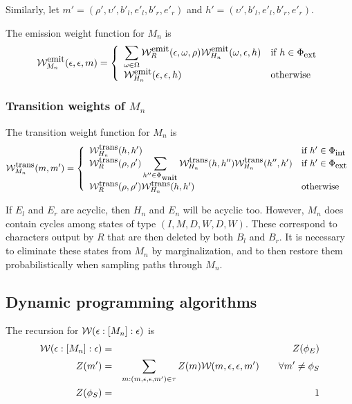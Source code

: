 \documentclass{article}
\newcommand{\seclabel}[1]{\label{sec.#1}}
\newcommand\wtrans[4]{#1(#2 : [#3] : #4)}
\newcommand\States{\Phi}
\newcommand\statesof[1]{\States_{#1}}
\newcommand\Transitions{\tau}
\newcommand\startstate{\phi_S}
\newcommand\laststate{\phi_E}
\newcommand\weight{{\cal W}}
\newcommand\weightfunof[1]{\weight_{#1}}
\newcommand\transweightfun[1]{\weightfunof{#1}^{\mbox{\small trans}}}
\newcommand\emitweightfun[1]{\weightfunof{#1}^{\mbox{\small emit}}}
\newcommand\stateset[1]{\statesof{\mbox{\small #1}}}
\newcommand\hstatedest{(\upsilon',b'_l,e'_l,b'_r,e'_r)}
\newcommand\externalsuffix{ext}
\newcommand\internalsuffix{int}
\newcommand\waitsuffix{wait}
\newcommand\externalcascades{\stateset{\externalsuffix}}
\newcommand\internalcascades{\stateset{\internalsuffix}}
\newcommand\waitstates{\stateset{\waitsuffix}}
\newcommand\mstatedest{(\rho',\upsilon',b'_l,e'_l,b'_r,e'_r)}
\begin{document}
Similarly, let $m' = \mstatedest$ and $h' = \hstatedest$.

The emission weight function for $M_n$ is
\[
\emitweightfun{M_n}(\epsilon,\epsilon,m) = \left\{
\begin{array}{ll}
\displaystyle
\sum_{\omega \in \Omega} \emitweightfun{R}(\epsilon,\omega,\rho) \emitweightfun{H_n}(\omega,\epsilon,h)
 & \mbox{if $h \in \externalcascades$} \\
\emitweightfun{H_n}(\epsilon,\epsilon,h)
 & \mbox{otherwise}
\end{array}
\right.
\]

\subsubsection{Transition weights of $M_n$}
The transition weight function for $M_n$ is
\[
\transweightfun{M_n}(m,m') = \left\{
\begin{array}{ll}
\displaystyle
\transweightfun{H_n}(h,h')
 & \mbox{if $h' \in \internalcascades$} \\
\displaystyle
\transweightfun{R}(\rho,\rho') \sum_{h'' \in \waitstates} \transweightfun{H_n}(h,h'') \transweightfun{H_n}(h'',h')
 & \mbox{if $h' \in \externalcascades$} \\
\transweightfun{R}(\rho,\rho') \transweightfun{H_n}(h,h')
 & \mbox{otherwise}
\end{array}
\right.
\]

If $E_l$ and $E_r$ are acyclic, then $H_n$ and $E_n$ will be acyclic too.
However, $M_n$ does contain cycles among states of type $(I,M,D,W,D,W)$.
These correspond to characters output by $R$ that are then deleted by both $B_l$ and $B_r$.
It is necessary to eliminate these states from $M_n$ by marginalization, and to then restore them probabilistically when sampling paths through $M_n$.

\subsection{Dynamic programming algorithms}
\seclabel{DynamicProgramming}
The recursion for $\wtrans{\weight}{\epsilon}{M_n}{\epsilon}$ is
\begin{eqnarray*}
\wtrans{\weight}{\epsilon}{M_n}{\epsilon} & = & Z(\laststate) \\
Z(m') & = & \sum_{m : (m,\epsilon,\epsilon,m') \in \Transitions} Z(m) \weightfunof{}(m,\epsilon,\epsilon,m')  \quad\quad \forall m' \neq \startstate \\
Z(\startstate) & = & 1
\end{eqnarray*}
\end{document}
